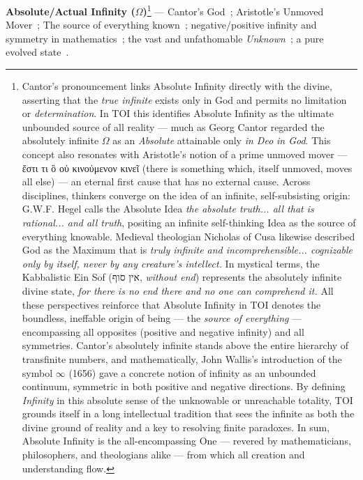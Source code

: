 \documentclass[11pt]{article}
\begin{document}
\textbf{Absolute/Actual Infinity (\( \Omega \))}\footnote{Cantor's pronouncement links Absolute Infinity directly with the divine, asserting that the \textit{true infinite} exists only in God and permits no limitation or \textit{determination}. In TOI this identifies Absolute Infinity as the ultimate unbounded source of all reality --- much as Georg Cantor regarded the absolutely infinite \( \Omega\) as an \textit{Absolute} attainable only \textit{in Deo} \textit{in God}. This concept also resonates with Aristotle's notion of a prime unmoved mover --- ἔστι τι ὃ οὐ κινούμενον κινεῖ (there is something which, itself unmoved, moves all else) --- an eternal first cause that has no external cause. Across disciplines, thinkers converge on the idea of an infinite, self-subsisting origin: G.W.F. Hegel calls the Absolute Idea \textit{the absolute truth... all that is rational... and all truth}, positing an infinite self-thinking Idea as the source of everything knowable. Medieval theologian Nicholas of Cusa likewise described God as the Maximum that is \textit{truly infinite and incomprehensible... cognizable only by itself, never by any creature's intellect.} In mystical terms, the Kabbalistic Ein Sof (אין סוף, \textit{without end}) represents the absolutely infinite divine state, \textit{for there is no end there and no one can comprehend it.} All these perspectives reinforce that Absolute Infinity in TOI denotes the boundless, ineffable origin of being --- the \textit{source of everything} --- encompassing all opposites (positive and negative infinity) and all symmetries. Cantor's absolutely infinite stands above the entire hierarchy of transfinite numbers, and mathematically, John Wallis's introduction of the symbol \(\infty\) (1656) gave a concrete notion of infinity as an unbounded continuum, symmetric in both positive and negative directions. By defining \textit{Infinity} in this absolute sense of the unknowable or unreachable totality, TOI grounds itself in a long intellectual tradition that sees the infinite as both the divine ground of reality and a key to resolving finite paradoxes. In sum, Absolute Infinity is the all-encompassing One --- revered by mathematicians, philosophers, and theologians alike --- from which all creation and understanding flow.}
\label{def:infinity} --- Cantor's God~\cite{cantor_absolute_infinity_1897}; Aristotle's Unmoved Mover~\cite{aristotle_metaphysics_1831}; The source of everything known~\cite{hegel_science_of_logic_1816}; negative/positive infinity and symmetry in mathematics~\cite{wallis_arithmetica_infinitorum_1656}; the vast and unfathomable \textit{Unknown}~\cite{cusanus_de_docta_ignorantia_1440}; a pure evolved state~\cite{zohar_1558}. 
\end{document}
